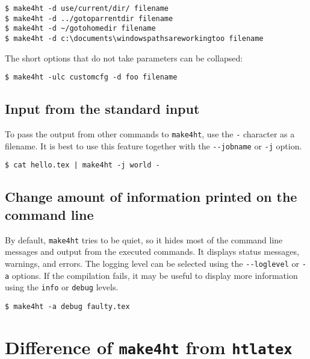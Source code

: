 \begin{verbatim}
$ make4ht -d use/current/dir/ filename
$ make4ht -d ../gotoparrentdir filename
$ make4ht -d ~/gotohomedir filename
$ make4ht -d c:\documents\windowspathsareworkingtoo filename
\end{verbatim}

The short options that do not take parameters can be collapsed:

\begin{verbatim}
$ make4ht -ulc customcfg -d foo filename
\end{verbatim}

\hypertarget{input-from-the-standard-input}{%
\subsection{Input from the standard
input}\label{input-from-the-standard-input}}

To pass the output from other commands to \texttt{make4ht}, use the
\texttt{-} character as a filename. It is best to use this feature
together with the \texttt{-\/-jobname} or \texttt{-j} option.

\begin{verbatim}
$ cat hello.tex | make4ht -j world -
\end{verbatim}

\hypertarget{change-amount-of-information-printed-on-the-command-line}{%
\subsection{Change amount of information printed on the command
line}\label{change-amount-of-information-printed-on-the-command-line}}

By default, \texttt{make4ht} tries to be quiet, so it hides most of the
command line messages and output from the executed commands. It displays
status messages, warnings, and errors. The logging level can be selected
using the \texttt{-\/-loglevel} or \texttt{-a} options. If the
compilation fails, it may be useful to display more information using
the \texttt{info} or \texttt{debug} levels.

\begin{verbatim}
$ make4ht -a debug faulty.tex
\end{verbatim}

\hypertarget{difference-of-make4ht-from-htlatex}{%
\section{\texorpdfstring{Difference of \texttt{make4ht} from
\texttt{htlatex}}{Difference of make4ht from htlatex}}\label{difference-of-make4ht-from-htlatex}}

